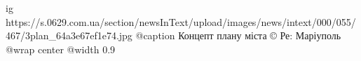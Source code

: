  
 
 
 
 

\ifcmt
  ig https://s.0629.com.ua/section/newsInText/upload/images/news/intext/000/055/467/3plan_64a3e67ef1e74.jpg
	@caption Концепт плану міста © Ре: Маріуполь
  @wrap center
  @width 0.9
\fi
